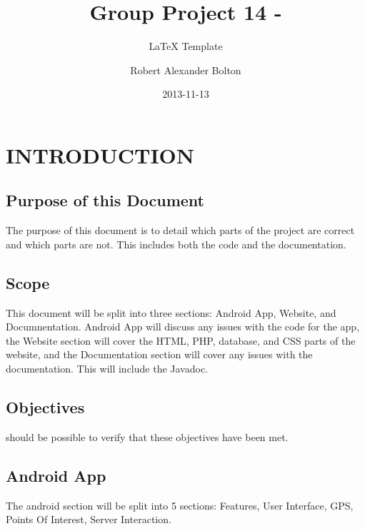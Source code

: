 \documentclass{project}
\begin{document}
\title{Group Project 14 -}

\subtitle{LaTeX Template}
\author{Robert Alexander Bolton}     
\date{2013-11-13}

\maketitle
\tableofcontents
\newpage


\section{INTRODUCTION}

\subsection{Purpose of this Document}
The purpose of this document is to detail which parts of the project are correct
and which parts are not. This includes both the code and the documentation. \cite{se.qa.03}

\subsection{Scope}
This document will be split into three sections: Android App, Website, and Documnentation.
Android App will discuss any issues with the code for the app, the Website section will cover the HTML,
PHP, database, and CSS parts of the website, and the Documentation section will cover any issues with the
documentation. This will include the Javadoc. \cite{se.qa.03}

\subsection{Objectives}
%
%
%
%
should be possible to verify that these objectives have been met. \cite{se.qa.03}


\subsection{Android App}
The android section will be split into 5 sections: Features, User Interface, GPS, Points Of Interest, Server Interaction.
\end{document}
